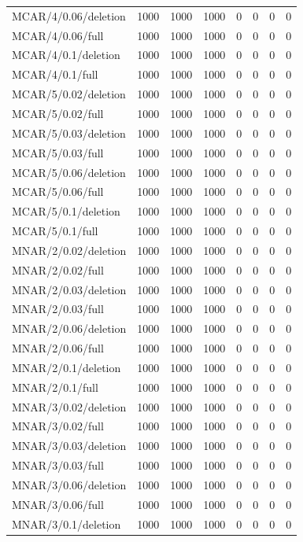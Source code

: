 \begin{longtable}{p{1.5in}p{.6in}p{.6in}p{.5in}p{.5in}p{.5in}p{.6in}p{.7in}}
MCAR/4/0.06/deletion & 1000 & 1000 & 1000 & 0 & 0 & 0 & 0\\
MCAR/4/0.06/full & 1000 & 1000 & 1000 & 0 & 0 & 0 & 0\\
MCAR/4/0.1/deletion & 1000 & 1000 & 1000 & 0 & 0 & 0 & 0\\
MCAR/4/0.1/full & 1000 & 1000 & 1000 & 0 & 0 & 0 & 0\\
MCAR/5/0.02/deletion & 1000 & 1000 & 1000 & 0 & 0 & 0 & 0\\
MCAR/5/0.02/full & 1000 & 1000 & 1000 & 0 & 0 & 0 & 0\\
MCAR/5/0.03/deletion & 1000 & 1000 & 1000 & 0 & 0 & 0 & 0\\
MCAR/5/0.03/full & 1000 & 1000 & 1000 & 0 & 0 & 0 & 0\\
MCAR/5/0.06/deletion & 1000 & 1000 & 1000 & 0 & 0 & 0 & 0\\
MCAR/5/0.06/full & 1000 & 1000 & 1000 & 0 & 0 & 0 & 0\\
MCAR/5/0.1/deletion & 1000 & 1000 & 1000 & 0 & 0 & 0 & 0\\
MCAR/5/0.1/full & 1000 & 1000 & 1000 & 0 & 0 & 0 & 0\\
MNAR/2/0.02/deletion & 1000 & 1000 & 1000 & 0 & 0 & 0 & 0\\
MNAR/2/0.02/full & 1000 & 1000 & 1000 & 0 & 0 & 0 & 0\\
MNAR/2/0.03/deletion & 1000 & 1000 & 1000 & 0 & 0 & 0 & 0\\
MNAR/2/0.03/full & 1000 & 1000 & 1000 & 0 & 0 & 0 & 0\\
MNAR/2/0.06/deletion & 1000 & 1000 & 1000 & 0 & 0 & 0 & 0\\
MNAR/2/0.06/full & 1000 & 1000 & 1000 & 0 & 0 & 0 & 0\\
MNAR/2/0.1/deletion & 1000 & 1000 & 1000 & 0 & 0 & 0 & 0\\
MNAR/2/0.1/full & 1000 & 1000 & 1000 & 0 & 0 & 0 & 0\\
MNAR/3/0.02/deletion & 1000 & 1000 & 1000 & 0 & 0 & 0 & 0\\
MNAR/3/0.02/full & 1000 & 1000 & 1000 & 0 & 0 & 0 & 0\\
MNAR/3/0.03/deletion & 1000 & 1000 & 1000 & 0 & 0 & 0 & 0\\
MNAR/3/0.03/full & 1000 & 1000 & 1000 & 0 & 0 & 0 & 0\\
MNAR/3/0.06/deletion & 1000 & 1000 & 1000 & 0 & 0 & 0 & 0\\
MNAR/3/0.06/full & 1000 & 1000 & 1000 & 0 & 0 & 0 & 0\\
MNAR/3/0.1/deletion & 1000 & 1000 & 1000 & 0 & 0 & 0 & 0\\

\end{longtable}
